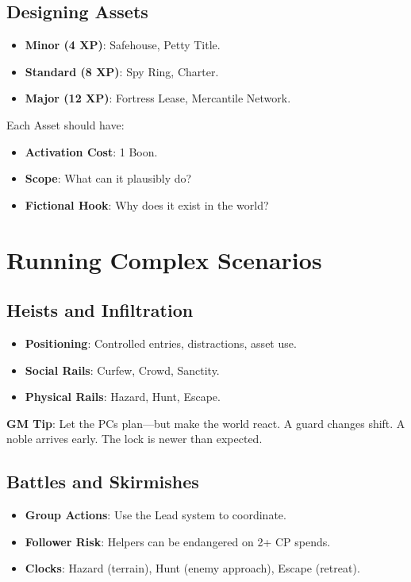 \subsection*{Designing Assets}

\begin{itemize}
    \item \textbf{Minor (4 XP)}: Safehouse, Petty Title.
    \item \textbf{Standard (8 XP)}: Spy Ring, Charter.
    \item \textbf{Major (12 XP)}: Fortress Lease, Mercantile Network.
\end{itemize}

Each Asset should have:
\begin{itemize}
    \item \textbf{Activation Cost}: 1 Boon.
    \item \textbf{Scope}: What can it plausibly do?
    \item \textbf{Fictional Hook}: Why does it exist in the world?
\end{itemize}

\section*{Running Complex Scenarios}

\subsection*{Heists and Infiltration}

\begin{itemize}
    \item \textbf{Positioning}: Controlled entries, distractions, asset use.
    \item \textbf{Social Rails}: Curfew, Crowd, Sanctity.
    \item \textbf{Physical Rails}: Hazard, Hunt, Escape.
\end{itemize}

\textbf{GM Tip}: Let the PCs plan—but make the world react. A guard changes shift. A noble arrives early. The lock is newer than expected.

\subsection*{Battles and Skirmishes}

\begin{itemize}
    \item \textbf{Group Actions}: Use the Lead system to coordinate.
    \item \textbf{Follower Risk}: Helpers can be endangered on 2+ CP spends.
    \item \textbf{Clocks}: Hazard (terrain), Hunt (enemy approach), Escape (retreat).
\end{itemize}

